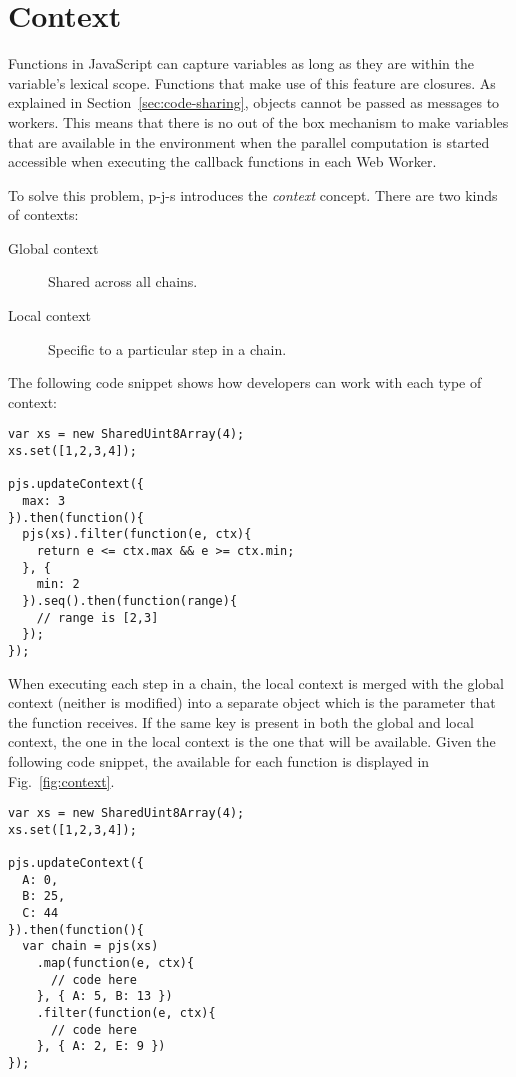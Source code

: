 \section{Context}\label{sec:context}

Functions in JavaScript can capture variables as long as they are within the variable's lexical scope. Functions that make use of this feature are closures. As explained in Section~\ref{sec:code-sharing},  objects cannot be passed as messages to workers. This means that there is no out of the box mechanism to make variables that are available in the environment when the parallel computation is started accessible when executing the callback functions in each Web Worker.

To solve this problem, p-j-s introduces the \emph{context} concept. There are two kinds of contexts:
\begin{description}
\item[Global context] Shared across all chains.
\item[Local context] Specific to a particular step in a chain.
\end{description}

The following code snippet shows how developers can work with each type of context:
\begin{lstlisting}[caption=Example using local and global context for chains]
var xs = new SharedUint8Array(4);
xs.set([1,2,3,4]);

pjs.updateContext({
  max: 3
}).then(function(){
  pjs(xs).filter(function(e, ctx){
    return e <= ctx.max && e >= ctx.min;
  }, {
    min: 2
  }).seq().then(function(range){
    // range is [2,3]
  });
});
\end{lstlisting}

When executing each step in a chain, the local context is merged with the global context (neither is modified) into a separate object which is the  parameter that the function receives. If the same key is present in both the global and local context, the one in the local context is the one that will be available. Given the following code snippet, the available  for each function is displayed in Fig.~\ref{fig:context}.
\begin{lstlisting}[caption=Example for resulting ctx]
var xs = new SharedUint8Array(4);
xs.set([1,2,3,4]);

pjs.updateContext({
  A: 0,
  B: 25,
  C: 44
}).then(function(){
  var chain = pjs(xs)
    .map(function(e, ctx){
      // code here
    }, { A: 5, B: 13 })
    .filter(function(e, ctx){
      // code here
    }, { A: 2, E: 9 })
});
\end{lstlisting}

